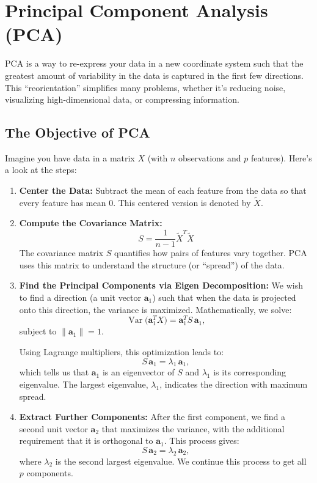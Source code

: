 \documentclass[10pt]{article}
\begin{document}
\section{Principal Component Analysis (PCA)}

PCA is a way to re-express your data in a new coordinate system such that the greatest amount of variability in the data is captured in the first few directions. This “reorientation” simplifies many problems, whether it's reducing noise, visualizing high-dimensional data, or compressing information.

\subsection{The Objective of PCA}

Imagine you have data in a matrix \(X\) (with \(n\) observations and \(p\) features). Here’s a look at the steps:

\begin{enumerate}
    \item \textbf{Center the Data:}  
    Subtract the mean of each feature from the data so that every feature has mean \(0\). This centered version is denoted by \(\tilde{X}\).

    \item \textbf{Compute the Covariance Matrix:}  
    \[
    S = \frac{1}{n-1} \tilde{X}^T\tilde{X}
    \]
    The covariance matrix \(S\) quantifies how pairs of features vary together. PCA uses this matrix to understand the structure (or ``spread'') of the data.

    \item \textbf{Find the Principal Components via Eigen Decomposition:}  
    We wish to find a direction (a unit vector \(\boldsymbol{a}_1\)) such that when the data is projected onto this direction, the variance is maximized. Mathematically, we solve:
    \[
    \operatorname{Var}\bigl(\boldsymbol{a}_1^T X\bigr) = \boldsymbol{a}_1^T S \, \boldsymbol{a}_1,
    \]
    subject to \(\|\boldsymbol{a}_1\| = 1\).

    Using Lagrange multipliers, this optimization leads to:
    \[
    S \, \boldsymbol{a}_1 = \lambda_1 \, \boldsymbol{a}_1,
    \]
    which tells us that \(\boldsymbol{a}_1\) is an eigenvector of \(S\) and \(\lambda_1\) is its corresponding eigenvalue. The largest eigenvalue, \(\lambda_1\), indicates the direction with maximum spread.

    \item \textbf{Extract Further Components:}  
    After the first component, we find a second unit vector \(\boldsymbol{a}_2\) that maximizes the variance, with the additional requirement that it is orthogonal to \(\boldsymbol{a}_1\). This process gives:
    \[
    S \, \boldsymbol{a}_2 = \lambda_2 \, \boldsymbol{a}_2,
    \]
    where \(\lambda_2\) is the second largest eigenvalue. We continue this process to get all \(p\) components.
\end{enumerate}
\end{document}
